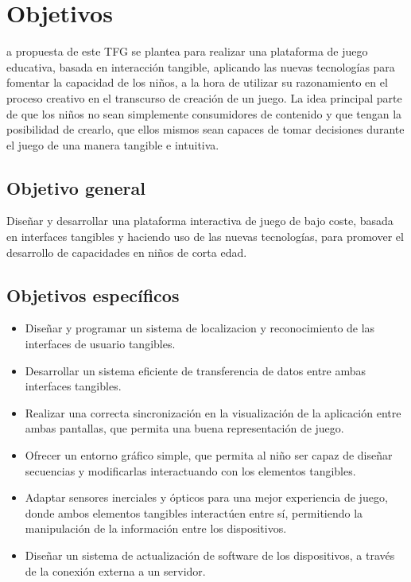 \chapter{Objetivos}
\label{chap:objetivos}

\noindent
{}a propuesta de este TFG se plantea para realizar una plataforma de juego educativa, basada en interacción tangible, aplicando las nuevas tecnologías para fomentar la capacidad de los niños, a la hora de utilizar su razonamiento en el proceso creativo en el transcurso de creación de un juego. La idea principal parte de que los niños no sean simplemente consumidores de contenido y que tengan la posibilidad de crearlo, que ellos mismos sean capaces de tomar decisiones durante el juego de una manera tangible e intuitiva. 


\section{Objetivo general}

Diseñar y desarrollar una plataforma interactiva de juego de bajo coste, basada en interfaces tangibles y haciendo uso de las nuevas tecnologías, para promover el desarrollo de capacidades en niños de corta edad.

\section{Objetivos específicos}

\begin{itemize}
\item Diseñar y programar un sistema de localizacion y reconocimiento de las interfaces de usuario tangibles.

\item Desarrollar un sistema eficiente de transferencia de datos entre ambas interfaces tangibles.

\item Realizar una correcta sincronización en la visualización de la aplicación entre ambas pantallas, que permita una buena representación de juego.

\item Ofrecer un entorno gráfico simple, que permita al niño ser capaz de diseñar secuencias y modificarlas interactuando con los elementos tangibles.

\item Adaptar sensores inerciales y ópticos para una mejor experiencia de juego, donde ambos elementos tangibles interactúen entre sí, permitiendo la manipulación de la información entre los dispositivos.

\item Diseñar un sistema de actualización de software de los dispositivos, a través de la conexión externa a un servidor.
\end{itemize}



